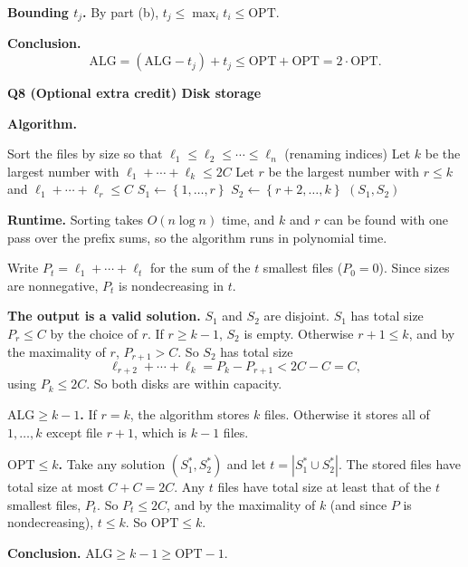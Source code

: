 \documentclass[11pt]{article}
\newcommand{\set}[1]{\left\{#1\right\}}
\newcommand{\abs}[1]{\left|#1\right|}
\newcommand{\OPT}{\mathrm{OPT}}
\newcommand{\ALG}{\mathrm{ALG}}
\newcommand{\qpage}[1]{\clearpage\noindent\textbf{\large #1}\par\medskip}
\begin{document}
\textbf{Bounding $t_j$.}
By part (b), $t_j \leq \max_i t_i \leq \OPT$.

\textbf{Conclusion.}
\[
  \ALG = (\ALG - t_j) + t_j \leq \OPT + \OPT = 2 \cdot \OPT.
\]

\qpage{Q8 (Optional extra credit) Disk storage}

\textbf{Algorithm.}
\begin{algorithmic}[1]
    \State Sort the files by size so that $\ell_1 \leq \ell_2 \leq \cdots \leq \ell_n$ (renaming indices)
    \State Let $k$ be the largest number with $\ell_1 + \cdots + \ell_k \leq 2C$ 
    \State Let $r$ be the largest number with $r \leq k$ and $\ell_1 + \cdots + \ell_r \leq C$
    \State $S_1 \gets \set{1, \ldots, r}$
    \State $S_2 \gets \set{r + 2, \ldots, k}$ 
    \State \Return $(S_1, S_2)$
  \EndFunction
\end{algorithmic}

\textbf{Runtime.}
Sorting takes $O(n \log n)$ time, and $k$ and $r$ can be found with one pass over the prefix sums, so the algorithm runs in polynomial time.

Write $P_t = \ell_1 + \cdots + \ell_t$ for the sum of the $t$ smallest files ($P_0 = 0$).
Since sizes are nonnegative, $P_t$ is nondecreasing in $t$.

\textbf{The output is a valid solution.}
$S_1$ and $S_2$ are disjoint.
$S_1$ has total size $P_r \leq C$ by the choice of $r$.
If $r \geq k - 1$, $S_2$ is empty.
Otherwise $r + 1 \leq k$, and by the maximality of $r$, $P_{r+1} > C$.
So $S_2$ has total size
\[
  \ell_{r+2} + \cdots + \ell_k = P_k - P_{r+1} < 2C - C = C,
\]
using $P_k \leq 2C$.
So both disks are within capacity.

\textbf{$\ALG \geq k - 1$.}
If $r = k$, the algorithm stores $k$ files.
Otherwise it stores all of $1, \ldots, k$ except file $r + 1$, which is $k - 1$ files.

\textbf{$\OPT \leq k$.}
Take any solution $(S_1^*, S_2^*)$ and let $t = \abs{S_1^* \cup S_2^*}$.
The stored files have total size at most $C + C = 2C$.
Any $t$ files have total size at least that of the $t$ smallest files, $P_t$.
So $P_t \leq 2C$, and by the maximality of $k$ (and since $P$ is nondecreasing), $t \leq k$.
So $\OPT \leq k$.

\textbf{Conclusion.}
$\ALG \geq k - 1 \geq \OPT - 1$.
\end{document}
